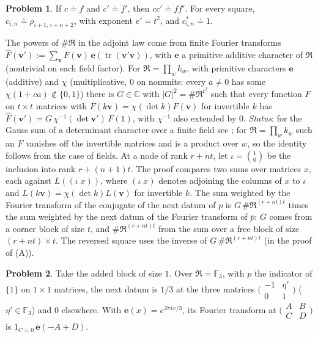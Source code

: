 \documentclass[reqno]{amsart}
\theoremstyle{definition}
\newtheorem{problem}{Problem}[section]
\theoremstyle{plain}
\newcommand{\C}{\mathbb C}
\newcommand{\F}{\mathbb F}
\begin{document}
\begin{problem}\label{pr:square-scalars}
If \(c \doteq f\) and \(c' \doteq f'\), then \(cc' \doteq ff'\).  For every square, \(c_{i,n} \doteq \rho_{i+1,\,i+n+2}\), with exponent \(e' = t^2\), and \(c^*_{i,n} \doteq 1\).
\end{problem}

The powers of \(\#\mathfrak R\) in the adjoint law come from finite Fourier transforms \(\hat F(\mathbf v') := \sum_{\mathbf v} F(\mathbf v)\,\mathbf e(\operatorname{tr}(\mathbf v'\mathbf v))\), with \(\mathbf e\) a primitive additive character of \(\mathfrak R\) (nontrivial on each field factor).  For \(\mathfrak R = \prod_w k_w\), with primitive characters \(\mathbf e\) (additive) and \(\chi\) (multiplicative, \(0\) on nonunits: every \(a \ne 0\) has some \(\chi(1+ca) \notin \{0,1\}\)) there is \(G \in \C\) with \(\lvert G\rvert^2 = \#\mathfrak R^{t^2}\) such that every function \(F\) on \(t \times t\) matrices with \(F(k\mathbf v) = \chi(\det k)F(\mathbf v)\) for invertible \(k\) has \(\hat F(\mathbf v') = G\,\chi^{-1}(\det \mathbf v')\,F(1)\), with \(\chi^{-1}\) also extended by \(0\).  \emph{Status}: for the Gauss sum of a determinant character over a finite field see \cite{Ko63}; for \(\mathfrak R = \prod_w k_w\) such an \(F\) vanishes off the invertible matrices and is a product over \(w\), so the identity follows from the case of fields.  At a node of rank \(r+nt\), let \(\iota=\binom{1}{0}\) be the inclusion into rank \(r+(n+1)t\).  The proof compares two sums over matrices \(x\), each against \(L((\iota\;x))\), where \((\iota\;x)\) denotes adjoining the columns of \(x\) to \(\iota\) and \(L(k\mathbf v)=\chi(\det k)L(\mathbf v)\) for invertible \(k\).  The sum weighted by the Fourier transform of the conjugate of the next datum of \(p\) is \(G\,\#\mathfrak R^{(r+nt)t}\) times the sum weighted by the next datum of the Fourier transform of \(\bar p\): \(G\) comes from a corner block of size \(t\), and \(\#\mathfrak R^{(r+nt)t}\) from the sum over a free block of size \((r+nt)\times t\).  The reversed square uses the inverse of \(G\,\#\mathfrak R^{(r+nt)t}\) (in the proof of (A)).

\begin{problem}\label{pr:next}
Take the added block of size \(1\).  Over \(\mathfrak R = \F_3\), with \(p\) the indicator of \(\{1\}\) on \(1 \times 1\) matrices, the next datum is \(1/3\) at the three matrices \(\bigl(\begin{smallmatrix}-1 & \eta'\\ 0 & 1\end{smallmatrix}\bigr)\) (\(\eta' \in \F_3\)) and \(0\) elsewhere.  With \(\mathbf e(x) = e^{2\pi i x/3}\), its Fourier transform at \(\bigl(\begin{smallmatrix}A & B\\ C & D\end{smallmatrix}\bigr)\) is \(1_{C=0}\,\mathbf e(-A+D)\).
\end{problem}
\end{document}
